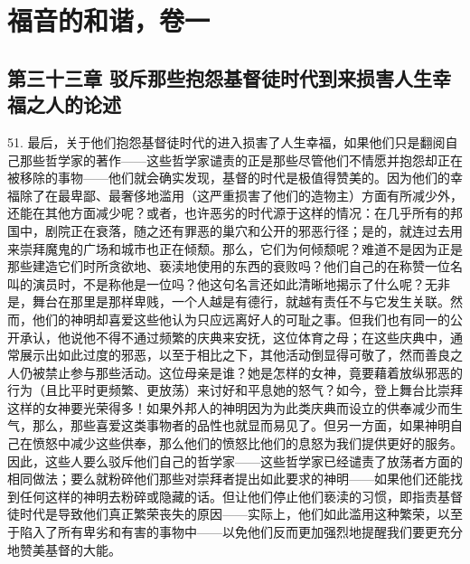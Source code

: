 

\section{福音的和谐，卷一}


\subsection{第三十三章 驳斥那些抱怨基督徒时代到来损害人生幸福之人的论述}

51. 最后，关于他们抱怨基督徒时代的进入损害了人生幸福，如果他们只是翻阅自己那些哲学家的著作——这些哲学家谴责的正是那些尽管他们不情愿并抱怨却正在被移除的事物——他们就会确实发现，基督的时代是极值得赞美的。因为他们的幸福除了在最卑鄙、最奢侈地滥用（这严重损害了他们的造物主）方面有所减少外，还能在其他方面减少呢？或者，也许恶劣的时代源于这样的情况：在几乎所有的邦国中，剧院正在衰落，随之还有罪恶的巢穴和公开的邪恶行径；是的，就连过去用来崇拜魔鬼的广场和城市也正在倾颓。那么，它们为何倾颓呢？难道不是因为正是那些建造它们时所贪欲地、亵渎地使用的东西的衰败吗？他们自己的在称赞一位名叫的演员时，不是称他是一位吗？他这句名言还如此清晰地揭示了什么呢？无非是，舞台在那里是那样卑贱，一个人越是有德行，就越有责任不与它发生关联。然而，他们的神明却喜爱这些他认为只应远离好人的可耻之事。但我们也有同一的公开承认，他说他不得不通过频繁的庆典来安抚，这位体育之母；在这些庆典中，通常展示出如此过度的邪恶，以至于相比之下，其他活动倒显得可敬了，然而善良之人仍被禁止参与那些活动。这位母亲是谁？她是怎样的女神，竟要藉着放纵邪恶的行为（且比平时更频繁、更放荡）来讨好和平息她的怒气？如今，登上舞台比崇拜这样的女神要光荣得多！如果外邦人的神明因为为此类庆典而设立的供奉减少而生气，那么，那些喜爱这类事物者的品性也就显而易见了。但另一方面，如果神明自己在愤怒中减少这些供奉，那么他们的愤怒比他们的息怒为我们提供更好的服务。因此，这些人要么驳斥他们自己的哲学家——这些哲学家已经谴责了放荡者方面的相同做法；要么就粉碎他们那些对崇拜者提出如此要求的神明——如果他们还能找到任何这样的神明去粉碎或隐藏的话。但让他们停止他们亵渎的习惯，即指责基督徒时代是导致他们真正繁荣丧失的原因——实际上，他们如此滥用这种繁荣，以至于陷入了所有卑劣和有害的事物中——以免他们反而更加强烈地提醒我们要更充分地赞美基督的大能。\par


